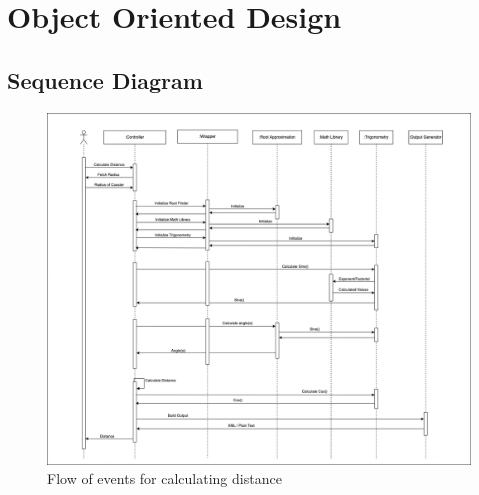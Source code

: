   \section{Object Oriented Design}
    \subsection{Sequence Diagram}
      \vspace{1cm}
      \begin{figure}[h!]
        \includegraphics[width=1\linewidth]{resources/cheers-sequence.png}
        \vspace{.5cm}
        \caption{Flow of events for calculating distance}
        \label{fig:Sequence Diagram}
      \end{figure}
      \pagebreak


